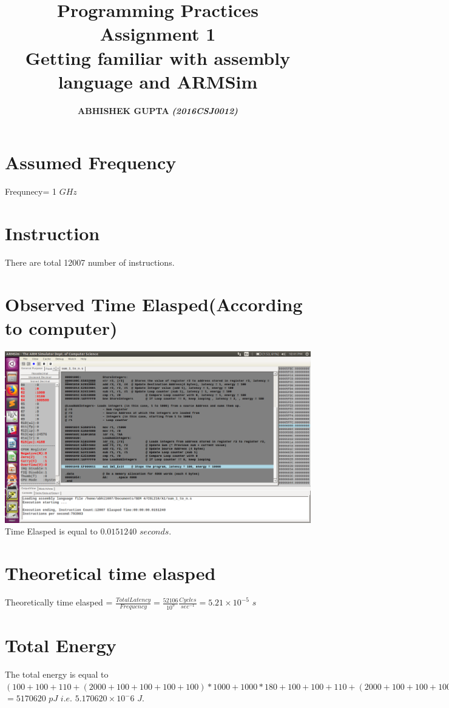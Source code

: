 \documentclass[]{article}
\begin{document}
\author{
  \textbf{ ABHISHEK GUPTA}
  \textbf{\textit{(2016CSJ0012)}}
}

\title{\textbf{Programming Practices \\Assignment 1\\Getting familiar with assembly language and ARMSim}}
\maketitle
\pagebreak
\section{Assumed Frequency}
Frequnecy= 1 $GHz$
\section{Instruction}
There are total 12007 number of instructions.
\section{Observed Time Elasped(According to computer)}
\includegraphics[scale=0.3]{screenshot}
Time Elasped is equal to $0.0151240$ $seconds$.
\section{Theoretical time elasped}
Theoretically time elasped = $\frac{Total Latency}{Frequency}=\frac{52106}{10^{9}}\frac{Cycles}{sec^{-1}}=5.21\times 10^{-5}$ $s$

\section{Total Energy}
The total energy is equal to $(100+100+110+(2000+100+100+100+100)*1000+1000*180+100+100+110+(2000+100+100+100+100)*1000+1000*180+10000) $\\$= 5170620 $   $pJ $ $  i.e.  $  $5.170620 \times 10^-6$  $J$.
\end{document}
